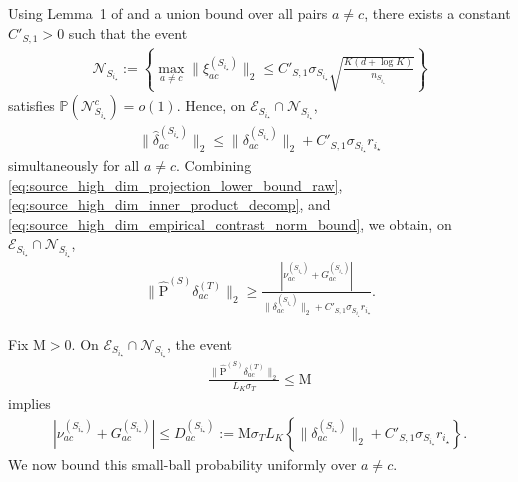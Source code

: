 \documentclass[10pt]{article}
\newcommand{\wh}{\widehat}
\newcommand{\trg}{T}
\newcommand{\sigmaT}{\sigma_{\trg}}
\newcommand{\src}{S}
\newcommand{\nSm}[1]{n_{\src_{#1}}}
\newcommand{\sigmaSm}[1]{\sigma_{\src_{#1}}}
\newcommand{\Pest}{\wh{\mathrm P}}
\begin{document}
Using Lemma~1 of \citet{laurent2000adaptive} and a union bound over all pairs $a\neq c$, there exists a constant $C'_{\src,1}>0$ such that the event
\begin{align}
\label{eq:source_high_dim_noise_norm_event}
    \mathcal N_{\src_{i_\star}}:=\left\{\max_{a\neq c}\|\xi_{ac}^{(\src_{i_\star})}\|_2\le C'_{\src,1}\sigmaSm{i_\star}\sqrt{\frac{K(d+\log K)}{\nSm{i_\star}}}\right\}
\end{align}
satisfies $\mathbb P(\mathcal N_{\src_{i_\star}}^c)=o(1)$. Hence, on $\mathcal E_{\src_{i_\star}}\cap\mathcal N_{\src_{i_\star}}$,
\begin{align}
\label{eq:source_high_dim_empirical_contrast_norm_bound}
    \|\widehat\delta_{ac}^{(\src_{i_\star})}\|_2\le \|\delta_{ac}^{(\src_{i_\star})}\|_2+C'_{\src,1}\sigmaSm{i_\star}r_{i_\star}
\end{align}
simultaneously for all $a\neq c$. Combining \eqref{eq:source_high_dim_projection_lower_bound_raw}, \eqref{eq:source_high_dim_inner_product_decomp}, and \eqref{eq:source_high_dim_empirical_contrast_norm_bound}, we obtain, on $\mathcal E_{\src_{i_\star}}\cap\mathcal N_{\src_{i_\star}}$,
\begin{align}
\label{eq:source_high_dim_projection_lower_bound}
    \|\Pest^{(\src)}\delta_{ac}^{(\trg)}\|_2\ge \frac{|\nu_{ac}^{(\src_{i_\star})}+G_{ac}^{(\src_{i_\star})}|}{\|\delta_{ac}^{(\src_{i_\star})}\|_2+C'_{\src,1}\sigmaSm{i_\star}r_{i_\star}}.
\end{align}

Fix $\mathrm M>0$. On $\mathcal E_{\src_{i_\star}}\cap\mathcal N_{\src_{i_\star}}$, the event
\begin{align}
\label{eq:source_high_dim_small_projection_event}
    \frac{\|\Pest^{(\src)}\delta_{ac}^{(\trg)}\|_2}{L_K\sigmaT}\le \mathrm M
\end{align}
implies
\begin{align}
\label{eq:source_high_dim_small_ball_radius}
    |\nu_{ac}^{(\src_{i_\star})}+G_{ac}^{(\src_{i_\star})}|\le D_{ac}^{(\src_{i_\star})}:=\mathrm M\sigmaT L_K\left\{\|\delta_{ac}^{(\src_{i_\star})}\|_2+C'_{\src,1}\sigmaSm{i_\star}r_{i_\star}\right\}.
\end{align}
We now bound this small-ball probability uniformly over $a\neq c$.
\end{document}
